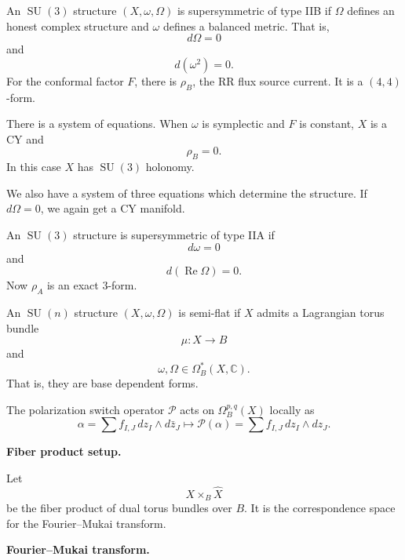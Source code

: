 \begin{definition}
\label{definition-su3-iib}
An $\operatorname{SU}(3)$ structure
$(X,\omega,\Omega)$ is supersymmetric
of type IIB if $\Omega$ defines an
honest complex structure and $\omega$
defines a balanced metric. That is,
$$
d\Omega=0
$$
and
$$
d(\omega^2)=0.
$$
For the conformal factor $F$, there
is $\rho_B$, the RR flux source
current. It is a $(4,4)$-form.
\end{definition}

\begin{remark}
\label{remark-su3-holonomy}
There is a system of equations.
When $\omega$ is symplectic and $F$
is constant, $X$ is a CY and
$$
\rho_B=0.
$$
In this case $X$ has
\(\operatorname{SU}(3)\) holonomy.
\end{remark}

\begin{remark}
\label{remark-su3-system}
We also have a system of three
equations which determine the
structure.
If $d\Omega=0$, we again get a CY
manifold.
\end{remark}

\begin{definition}
\label{definition-su3-iia}
An $\operatorname{SU}(3)$ structure
is supersymmetric of type IIA if
$$
d\omega=0
$$
and
$$
d(\operatorname{Re}\Omega)=0.
$$
Now $\rho_A$ is an exact $3$-form.
\end{definition}

\begin{definition}
\label{definition-su-n-semi-flat}
An $\operatorname{SU}(n)$ structure
$(X,\omega,\Omega)$ is semi-flat if
$X$ admits a Lagrangian torus bundle
$$
\mu:X\to B
$$
and
$$
\omega,\Omega\in\Omega_B^*(X,\mathbb{C}).
$$
That is, they are base dependent forms.
\end{definition}

\begin{definition}
\label{definition-polarization-switch}
The polarization switch operator
\(\mathcal{P}\) acts on
\(\Omega_B^{p,q}(X)\) locally as
$$
\alpha=\sum f_{I,J}\,dz_I\wedge
d\bar z_J
\mapsto
\mathcal{P}(\alpha)
=\sum f_{I,J}\,dz_I\wedge dz_J.
$$
\end{definition}

\medskip\noindent
{\bf Fiber product setup.}

Let
$$
X\times_B \widehat X
$$
be the fiber product of dual torus
bundles over $B$.
It is the correspondence space for
the Fourier--Mukai transform.

\medskip\noindent
{\bf Fourier--Mukai transform.}

